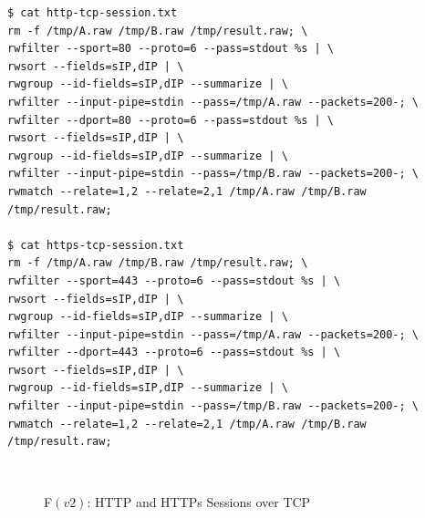 \begin{lstlisting}
$ cat http-tcp-session.txt
rm -f /tmp/A.raw /tmp/B.raw /tmp/result.raw; \
rwfilter --sport=80 --proto=6 --pass=stdout %s | \
rwsort --fields=sIP,dIP | \
rwgroup --id-fields=sIP,dIP --summarize | \
rwfilter --input-pipe=stdin --pass=/tmp/A.raw --packets=200-; \
rwfilter --dport=80 --proto=6 --pass=stdout %s | \
rwsort --fields=sIP,dIP | \
rwgroup --id-fields=sIP,dIP --summarize | \
rwfilter --input-pipe=stdin --pass=/tmp/B.raw --packets=200-; \
rwmatch --relate=1,2 --relate=2,1 /tmp/A.raw /tmp/B.raw /tmp/result.raw;

$ cat https-tcp-session.txt
rm -f /tmp/A.raw /tmp/B.raw /tmp/result.raw; \
rwfilter --sport=443 --proto=6 --pass=stdout %s | \
rwsort --fields=sIP,dIP | \
rwgroup --id-fields=sIP,dIP --summarize | \
rwfilter --input-pipe=stdin --pass=/tmp/A.raw --packets=200-; \
rwfilter --dport=443 --proto=6 --pass=stdout %s | \
rwsort --fields=sIP,dIP | \
rwgroup --id-fields=sIP,dIP --summarize | \
rwfilter --input-pipe=stdin --pass=/tmp/B.raw --packets=200-; \
rwmatch --relate=1,2 --relate=2,1 /tmp/A.raw /tmp/B.raw /tmp/result.raw;
\end{lstlisting}

\begin{figure}[ht!]
\centering
{}\quad
{}\\
\caption{F$(v2)$: HTTP and HTTPs Sessions over TCP}
\label{fig:http-https-tcp-sessions}
\end{figure}




